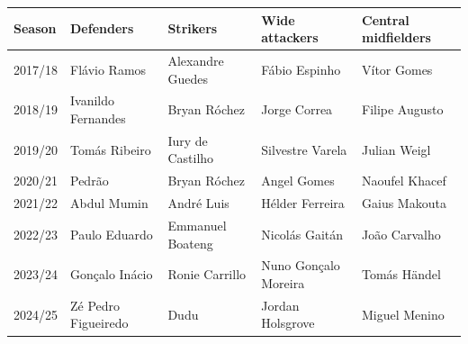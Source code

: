 \begin{tabular}{lllll}
\toprule
Season & Defenders & Strikers & Wide attackers & Central midfielders \\
\midrule
2017/18 & Flávio Ramos & Alexandre Guedes & Fábio Espinho & Vítor Gomes \\
2018/19 & Ivanildo Fernandes & Bryan Róchez & Jorge Correa & Filipe Augusto \\
2019/20 & Tomás Ribeiro & Iury de Castilho & Silvestre Varela & Julian Weigl \\
2020/21 & Pedrão & Bryan Róchez & Angel Gomes & Naoufel Khacef \\
2021/22 & Abdul Mumin & André Luis & Hélder Ferreira & Gaius Makouta \\
2022/23 & Paulo Eduardo & Emmanuel Boateng & Nicolás Gaitán & João Carvalho \\
2023/24 & Gonçalo Inácio & Ronie Carrillo & Nuno Gonçalo Moreira & Tomás Händel \\
2024/25 & Zé Pedro Figueiredo & Dudu & Jordan Holsgrove & Miguel Menino \\
\bottomrule
\end{tabular}
